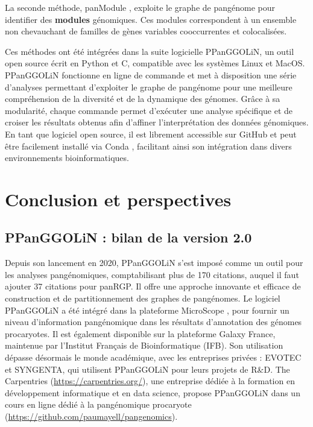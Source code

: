 La seconde méthode, panModule \cite{bazin_panmodule_2021}, exploite le graphe de pangénome pour identifier des \textbf{modules} génomiques. Ces modules correspondent à un ensemble non chevauchant de familles de gènes variables cooccurrentes et colocalisées. 

Ces méthodes  ont été intégrées dans la suite logicielle PPanGGOLiN, un outil open source écrit en Python et C, compatible avec les systèmes Linux et MacOS. PPanGGOLiN fonctionne en ligne de commande et met à disposition une série d’analyses permettant d’exploiter le graphe de pangénome pour une meilleure compréhension de la diversité et de la dynamique des génomes. Grâce à sa modularité, chaque commande permet d’exécuter une analyse spécifique et de croiser les résultats obtenus afin d’affiner l’interprétation des données génomiques. En tant que logiciel open source, il est librement accessible sur GitHub \cite{https://github.com/labgem/PPanGGOLiN} et peut être facilement installé via Conda \cite{https://anaconda.org/bioconda/ppanggolin}, facilitant ainsi son intégration dans divers environnements bioinformatiques.







\chapter{Conclusion et perspectives}

\section{PPanGGOLiN : bilan de la version 2.0}

Depuis son lancement en 2020, PPanGGOLiN s’est imposé comme un outil pour les analyses pangénomiques, comptabilisant plus de 170 citations, auquel il faut ajouter 37 citations pour panRGP. Il offre une approche innovante et efficace de construction et de partitionnement des graphes de pangénomes. Le logiciel PPanGGOLiN a été intégré dans la plateforme MicroScope \cite{vallenet_microscope_2020}, pour fournir un niveau d'information pangénomique dans les résultats d'annotation des génomes procaryotes. Il est également disponible sur la plateforme Galaxy France, maintenue par l'Institut Français de Bioinformatique (IFB). Son utilisation dépasse désormais le monde académique, avec les entreprises privées : EVOTEC et SYNGENTA, qui utilisent PPanGGOLiN pour leurs projets de R\&D. The Carpentries (\url{https://carpentries.org/}), une entreprise dédiée à la formation en développement informatique et en data science, propose PPanGGOLiN dans un cours en ligne dédié à la pangénomique procaryote (\url{https://github.com/paumayell/pangenomics}).

